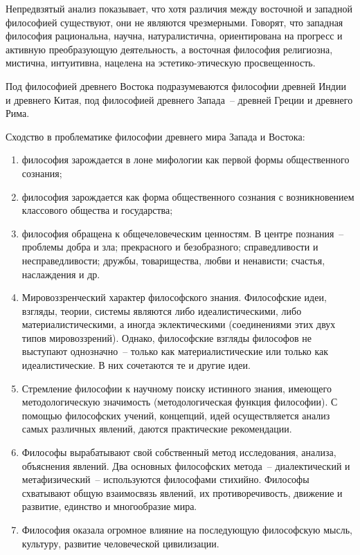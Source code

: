 
Непредвзятый анализ показывает, что хотя различия между восточной и западной философией существуют,
они не являются чрезмерными. Говорят, что западная философия рациональна, научна, натуралистична,
ориентирована на прогресс и активную преобразующую деятельность, а восточная философия религиозна,
мистична, интуитивна, нацелена на эстетико-этическую просвещенность.

Под философией древнего Востока подразумеваются философии древней Индии и древнего Китая, под
философией древнего Запада~-- древней Греции и древнего Рима.

Сходство в проблематике философии древнего мира Запада и Востока:
\begin{enumerate}
    \vspace*{-1.8ex}
    \itemsep-1.2ex
    \item философия зарождается в лоне мифологии как первой формы общественного сознания;
    \item философия зарождается как форма общественного сознания с возникновением классового
        общества и государства;
    \item философия обращена к общечеловеческим ценностям. В центре познания~-- проблемы
        добра и зла; прекрасного и безобразного; справедливости и несправедливости; дружбы,
        товарищества, любви и ненависти; счастья, наслаждения и др.
    \item Мировоззренческий характер философского знания. Философские идеи, взгляды, теории,
        системы являются либо идеалистическими, либо материалистическими, а иногда
        эклектическими (соединениями этих двух типов мировоззрений). Однако, философские
        взгляды философов не выступают однозначно~-- только как материалистические или только
        как идеалистические. В них сочетаются те и другие идеи.
    \item Стремление философии к научному поиску истинного знания, имеющего методологическую
        значимость (методологическая функция философии). С помощью философских учений,
        концепций, идей осуществляется анализ самых различных явлений, даются практические
        рекомендации.
    \item Философы вырабатывают свой собственный метод исследования, анализа, объяснения
        явлений. Два основных философских метода~-- диалектический и метафизический~--
        используются философами стихийно. Философы схватывают общую взаимосвязь явлений, их
        противоречивость, движение и развитие, единство и многообразие мира.
    \item Философия оказала огромное влияние на последующую философскую мысль, культуру,
        развитие человеческой цивилизации.
    \vspace*{-1.8ex}
\end{enumerate}

